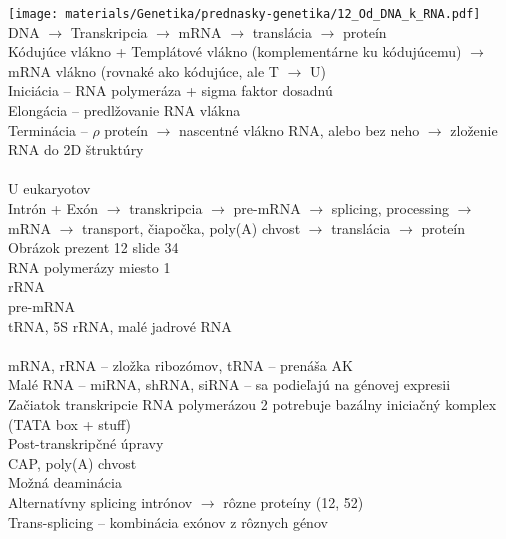 \texttt{[image: materials/Genetika/prednasky-genetika/12\_Od\_DNA\_k\_RNA.pdf]}
\\
DNA $\rightarrow$ Transkripcia $\rightarrow$ mRNA $\rightarrow$ translácia $\rightarrow$ proteín\\
Kódujúce vlákno + Templátové vlákno (komplementárne ku kódujúcemu) $\rightarrow$ mRNA vlákno (rovnaké ako kódujúce, ale T $\rightarrow$ U)\\
Iniciácia -- RNA polymeráza + sigma faktor dosadnú\\
Elongácia -- predlžovanie RNA vlákna\\
Terminácia -- $\rho$ proteín $\rightarrow$ nascentné vlákno RNA,  alebo bez neho $\rightarrow$ zloženie RNA do 2D štruktúry\\
\\
\tab U eukaryotov\\
\tab \tab Intrón + Exón $\rightarrow$ transkripcia $\rightarrow$ pre-mRNA $\rightarrow$ splicing, processing $\rightarrow$ mRNA $\rightarrow$ transport, čiapočka, poly(A) chvost $\rightarrow$ translácia $\rightarrow$ proteín\\
\tab \tab Obrázok prezent 12 slide 34\\
\tab {} RNA polymerázy miesto 1\\
\tab \tab \tab rRNA\\
\tab \tab \tab pre-mRNA\\
\tab \tab \tab tRNA, 5S rRNA, malé jadrové RNA\\
\\
\tab mRNA, rRNA -- zložka ribozómov, tRNA -- prenáša AK\\
\tab Malé RNA -- miRNA, shRNA, siRNA -- sa podieľajú na génovej expresii\\
\tab Začiatok transkripcie RNA polymerázou 2 potrebuje bazálny iniciačný komplex (TATA box + stuff)\\
\tab Post-transkripčné úpravy\\
\tab \tab CAP, poly(A) chvost\\
\tab \tab Možná deaminácia\\
\tab \tab Alternatívny splicing intrónov $\rightarrow$ rôzne proteíny (12, 52)\\
\tab \tab Trans-splicing -- kombinácia exónov z rôznych génov\\
